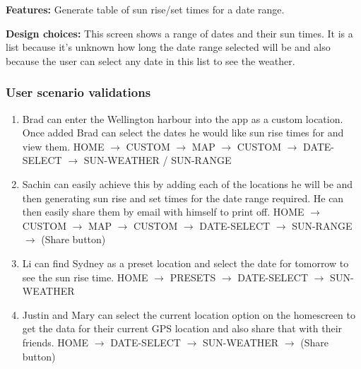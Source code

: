 \documentclass[11pt,english,numbers=endperiod,parskip=half]{scrartcl}
\begin{document}
\textbf{Features: }Generate table of sun rise/set times for a date range.

\textbf{Design choices: }This screen shows a range of dates and their sun times.
It is a list because it's unknown how long the date range selected will be and
also because the user can select any date in this list to see the weather.

\subsubsection{User scenario validations}
\begin{enumerate}
	\item{Brad can enter the Wellington harbour into the app as a custom location.
	Once added Brad can select the dates he would like sun rise times for and view them.
	HOME $\rightarrow$ CUSTOM $\rightarrow$ MAP $\rightarrow$ CUSTOM $\rightarrow$ DATE-SELECT $\rightarrow$ SUN-WEATHER / SUN-RANGE}
	\item{Sachin can easily achieve this by adding each of the locations he will be
	and then generating sun rise and set times for the date range required. He can
	then easily share them by email with himself to print off.
	HOME $\rightarrow$ CUSTOM $\rightarrow$ MAP $\rightarrow$ CUSTOM $\rightarrow$ DATE-SELECT $\rightarrow$ SUN-RANGE $\rightarrow$ (Share button)}
	\item{Li can find Sydney as a preset location and select the date for tomorrow
	to see the sun rise time.
	HOME $\rightarrow$ PRESETS $\rightarrow$ DATE-SELECT $\rightarrow$ SUN-WEATHER}
	\item{Justin and Mary can select the current location option on the homescreen
	to get the data for their current GPS location and also share that with their
	friends.
	HOME $\rightarrow$ DATE-SELECT $\rightarrow$ SUN-WEATHER $\rightarrow$ (Share button)}
\end{enumerate}
\end{document}
